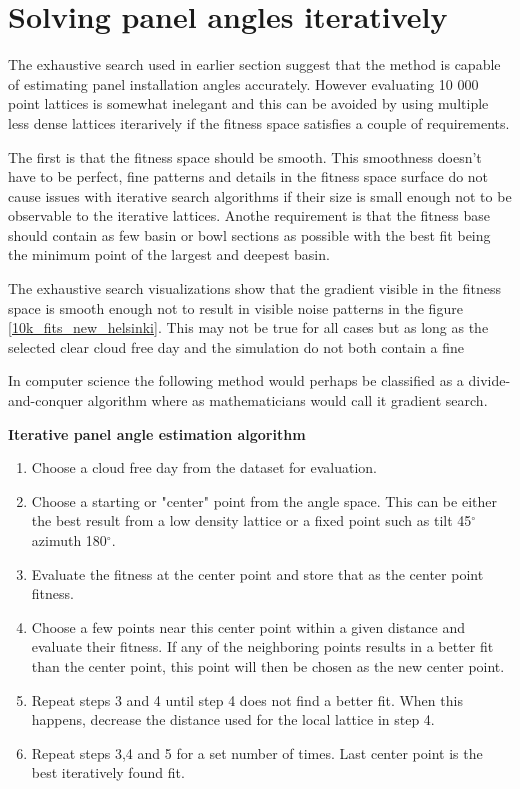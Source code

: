 \section{Solving panel angles iteratively}
The exhaustive search used in earlier section suggest that the method is capable of estimating panel installation angles accurately. However evaluating 10 000 point lattices is somewhat inelegant and this can be avoided by using multiple less dense lattices iterarively if the fitness space satisfies a couple of requirements.

The first is that the fitness space should be smooth. This smoothness doesn't have to be perfect, fine patterns and details in the fitness space surface do not cause issues with iterative search algorithms if their size is small enough not to be observable to the iterative lattices. Anothe requirement is that the fitness base should contain as few basin or bowl sections as possible with the best fit being the minimum point of the largest and deepest basin.

The exhaustive search visualizations show that the gradient visible in the fitness space is smooth enough not to result in visible noise patterns in the figure \ref{10k_fits_new_helsinki}. This may not be true for all cases but as long as the selected clear cloud free day and the simulation do not both contain a fine 



 In computer science the following method would perhaps be classified as a divide-and-conquer algorithm where as mathematicians would call it gradient search.

\noindent \textbf{Iterative panel angle estimation algorithm}
\begin{enumerate}
	\item Choose a cloud free day from the dataset for evaluation.
  \item Choose a starting or "center" point from the angle space. This can be either the best result from a low density lattice or a fixed point such as tilt 45$^\circ$ azimuth 180$^\circ$.
  \item Evaluate the fitness at the center point and store that as the center point fitness.
  \item Choose a few points near this center point within a given distance and evaluate their fitness. If any of the neighboring points results in a better fit than the center point, this point will then be chosen as the new center point.
  \item Repeat steps 3 and 4 until step 4 does not find a better fit. When this happens, decrease the distance used for the local lattice in step 4.
  \item Repeat steps 3,4 and 5 for a set number of times. Last center point is the best iteratively found fit.
\end{enumerate}



